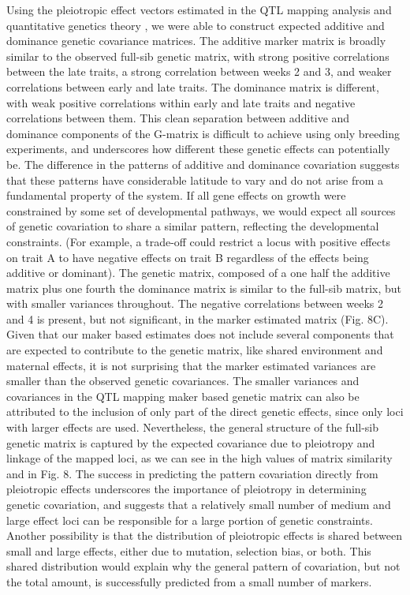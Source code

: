 \begin{refsection}
Using the pleiotropic effect vectors estimated in the QTL mapping
analysis and quantitative genetics theory \parencite{Kelly2009-bj}, we were able
to construct expected additive and dominance genetic covariance
matrices. The additive marker matrix is broadly similar to the observed
full-sib genetic matrix, with strong positive correlations between the
late traits, a strong correlation between weeks 2 and 3, and weaker
correlations between early and late traits. The dominance matrix is
different, with weak positive correlations within early and late traits
and negative correlations between them. This clean separation between
additive and dominance components of the G-matrix is difficult to
achieve using only breeding experiments, and underscores how different
these genetic effects can potentially be. The difference in the patterns
of additive and dominance covariation suggests that these patterns have
considerable latitude to vary and do not arise from a fundamental
property of the system. If all gene effects on growth were constrained
by some set of developmental pathways, we would expect all sources of
genetic covariation to share a similar pattern, reflecting the
developmental constraints. (For example, a trade-off could restrict a
locus with positive effects on trait A to have negative effects on trait
B regardless of the effects being additive or dominant). The genetic
matrix, composed of a one half the additive matrix plus one fourth the
dominance matrix is similar to the full-sib matrix, but with smaller
variances throughout. The negative correlations between weeks 2 and 4 is
present, but not significant, in the marker estimated matrix (Fig. 8C).
Given that our maker based estimates does not include several components
that are expected to contribute to the genetic matrix, like shared
environment and maternal effects, it is not surprising that the marker
estimated variances are smaller than the observed genetic covariances.
The smaller variances and covariances in the QTL mapping maker based
genetic matrix can also be attributed to the inclusion of only part of
the direct genetic effects, since only loci with larger effects are
used. Nevertheless, the general structure of the full-sib genetic matrix
is captured by the expected covariance due to pleiotropy and linkage of
the mapped loci, as we can see in the high values of matrix similarity
and in Fig. 8. The success in predicting the pattern covariation
directly from pleiotropic effects underscores the importance of
pleiotropy in determining genetic covariation, and suggests that a
relatively small number of medium and large effect loci can be
responsible for a large portion of genetic constraints. Another
possibility is that the distribution of pleiotropic effects is shared
between small and large effects, either due to mutation, selection bias,
or both. This shared distribution would explain why the general pattern
of covariation, but not the total amount, is successfully predicted from
a small number of markers.


\end{refsection}
